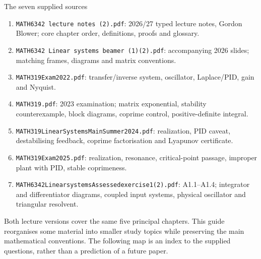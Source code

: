 \begin{concept}{The seven supplied sources}
\begin{enumerate}
\item \texttt{MATH6342 lecture notes (2).pdf}: 2026/27 typed lecture notes, Gordon Blower; core chapter order, definitions, proofs and glossary.
\item \texttt{MATH6342 Linear systems beamer (1)(2).pdf}: accompanying 2026 slides; matching frames, diagrams and matrix conventions.
\item \texttt{MATH319Exam2022.pdf}: transfer/inverse system, oscillator, Laplace/PID, gain and Nyquist.
\item \texttt{MATH319.pdf}: 2023 examination; matrix exponential, stability counterexample, block diagrams, coprime control, positive-definite integral.
\item \texttt{MATH319LinearSystemsMainSummer2024.pdf}: realization, PID caveat, destabilising feedback, coprime factorisation and Lyapunov certificate.
\item \texttt{MATH319Exam2025.pdf}: realization, resonance, critical-point passage, improper plant with PID, stable coprimeness.
\item \texttt{MATH6342LinearsystemsAssessedexercise1(2).pdf}: A1.1--A1.4; integrator and differentiator diagrams, coupled input systems, physical oscillator and triangular resolvent.
\end{enumerate}
Both lecture versions cover the same five principal chapters. This guide reorganises some material into smaller study topics while preserving the main mathematical conventions. The following map is an index to the supplied questions, rather than a prediction of a future paper.
\end{concept}
